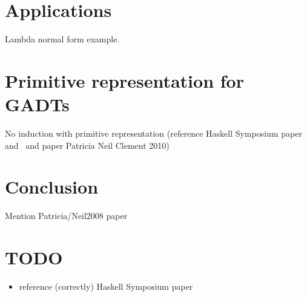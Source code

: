\documentclass[acmsmall,screen,review,anonymous]{acmart}
\theoremstyle{definition}
\begin{document}
\section{Applications}

Lambda normal form example.



\section{Primitive representation for GADTs}

No induction with primitive representation (reference Haskell Symposium paper and~\cite{jp19} and paper Patricia Neil Clement 2010)



\section{Conclusion}

Mention Patricia/Neil2008 paper



\section{TODO}

\begin{itemize}
\item reference (correctly) Haskell Symposium paper
\end{itemize}


%
%



\end{document}
